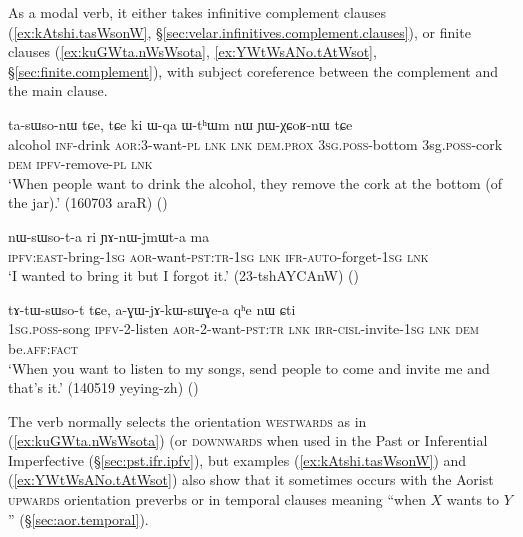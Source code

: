As a modal verb, it either takes infinitive complement clauses (\ref{ex:kAtshi.tasWsonW}, §\ref{sec:velar.infinitives.complement.clauses}), or finite clauses (\ref{ex:kuGWta.nWsWsota}, \ref{ex:YWtWsANo.tAtWsot}, §\ref{sec:finite.complement}), with subject coreference between the complement and the main clause.  
 
\begin{exe}
\ex \label{ex:kAtshi.tasWsonW}
 ta-sɯso-nɯ tɕe, tɕe ki ɯ-qa ɯ-tʰɯm nɯ ɲɯ-χɕoʁ-nɯ tɕe \\
alcohol \textsc{inf}-drink \textsc{aor}:3\flobv{}-want-\textsc{pl} \textsc{lnk} \textsc{lnk} \textsc{dem}.\textsc{prox} \textsc{3sg}.\textsc{poss}-bottom {3sg}.\textsc{poss}-cork \textsc{dem} \textsc{ipfv}-remove-\textsc{pl} \textsc{lnk} \\
\glt `When people want to drink the alcohol, they remove the cork at the bottom (of the jar).' (160703 araR)
()
\end{exe}

\begin{exe}
\ex \label{ex:kuGWta.nWsWsota}
\gll [ku-ɣɯt-a] nɯ-sɯso-t-a ri ɲɤ-nɯ-jmɯt-a ma \\
\textsc{ipfv}:\textsc{east}-bring-\textsc{1sg} \textsc{aor}-want-\textsc{pst}:\textsc{tr}-\textsc{1sg} \textsc{lnk} \textsc{ifr}-\textsc{auto}-forget-\textsc{1sg} \textsc{lnk} \\
\glt `I wanted to bring it but I forgot it.' (23-tshAYCAnW)
()
\end{exe}
 
\begin{exe}
\ex \label{ex:YWtWsANo.tAtWsot}
 tɤ-tɯ-sɯso-t tɕe, a-ɣɯ-jɤ-kɯ-sɯɣe-a qʰe nɯ ɕti \\
\textsc{1sg}.\textsc{poss}-song \textsc{ipfv}-2-listen \textsc{aor}-2-want-\textsc{pst}:\textsc{tr} \textsc{lnk} \textsc{irr}-\textsc{cisl}-invite-\textsc{1sg} \textsc{lnk} \textsc{dem} be.\textsc{aff}:\textsc{fact} \\
\glt   `When you want to listen to my songs, send people to come and invite me and that's it.' (140519 yeying-zh)
()
\end{exe}

The verb  normally selects the orientation \textsc{westwards} as in (\ref{ex:kuGWta.nWsWsota}) (or \textsc{downwards} when used in the Past or Inferential Imperfective (§\ref{sec:pst.ifr.ipfv}), but examples (\ref{ex:kAtshi.tasWsonW}) and (\ref{ex:YWtWsANo.tAtWsot}) also show that it sometimes occurs with the Aorist \textsc{upwards} orientation preverbs  or  in temporal clauses meaning ``when $X$ wants to $Y$'' (§\ref{sec:aor.temporal}).
  
